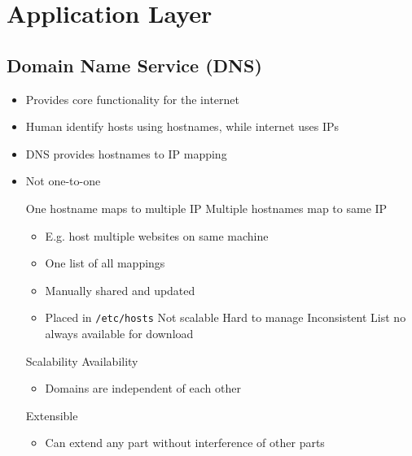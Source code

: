 
\section{Application Layer}
\subsection{Domain Name Service (DNS)}
\begin{itemize}
    \item Provides core functionality for the internet
    \item Human identify hosts using hostnames, while internet uses IPs
    \item DNS provides hostnames to IP mapping
    \item Not one-to-one
        \begin{itemize}
             One hostname maps to multiple IP
             Multiple hostnames map to same IP
                \begin{itemize}
                    \item E.g. host multiple websites on same machine
                \end{itemize}
        \end{itemize}
        \begin{itemize}
            \item One list of all mappings
            \item Manually shared and updated
            \item Placed in \verb+/etc/hosts+
            \icon Not scalable
            \icon Hard to manage
            \icon Inconsistent
            \icon List no always available for download
        \end{itemize}
    \ipro Scalability
    \ipro Availability
        \begin{itemize}
            \item Domains are independent of each other
        \end{itemize}
    \ipro Extensible
        \begin{itemize}
            \item Can extend any part without interference of other parts
        \end{itemize}
\end{itemize}


